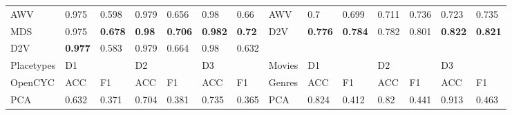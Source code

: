 {\begin{landscape}
\begin{table}[]
\begin{tabular}{llllllllllllll}
AWV        & 0.975                           & 0.598                           & 0.979                           & 0.656                           & 0.98                            & 0.66                            & AWV                             & 0.7                             & 0.699                           & 0.711                           & 0.736                           & 0.723                           & 0.735                           \\
MDS        & 0.975                           & \textbf{0.678} & \textbf{0.98}  & \textbf{0.706} & \textbf{0.982} & \textbf{0.72}  & D2V                             & \textbf{0.776} & \textbf{0.784} & 0.782                           & 0.801                           & \textbf{0.822} & \textbf{0.821} \\
D2V        & \textbf{0.977} & 0.583                           & 0.979                           & 0.664                           & 0.98                            & 0.632                           &                                 &                                 &                                 &                                 &                                 &                                 &                                 \\
Placetypes & D1                              &                                 & D2                              &                                 & D3                              &                                 & Movies                          & D1                              &                                 & D2                              &                                 & D3                              &                                 \\
OpenCYC    & ACC                             & F1                              & ACC                             & F1                              & ACC                             & F1                              & Genres                          & ACC                             & F1                              & ACC                             & F1                              & ACC                             & F1                              \\
PCA        & 0.632                           & 0.371                           & 0.704                           & 0.381                           & 0.735                           & 0.365                           & PCA                             & 0.824                           & 0.412                           & 0.82                            & 0.441                           & 0.913                           & 0.463                           \\

\end{tabular}
\end{table}
\end{landscape}}
